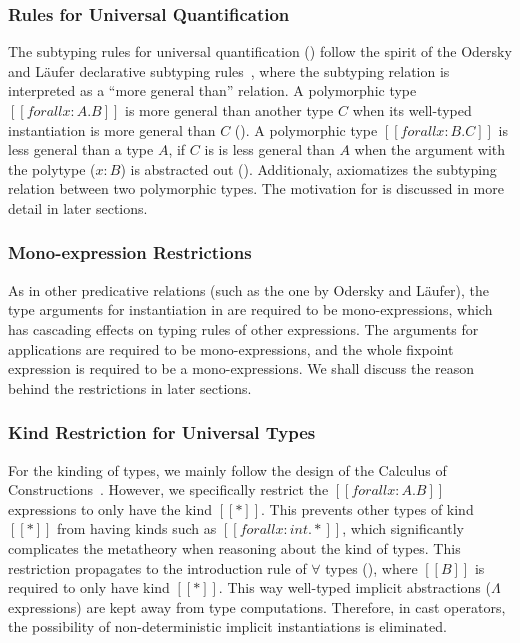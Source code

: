\subsubsection{Rules for Universal Quantification}
The subtyping rules for universal quantification () follow
the spirit of the Odersky and L\"aufer declarative subtyping rules~\cite{oderskylaufer,DunfieldJoshua2013Caeb},
where the subtyping relation is interpreted as a ``more general than'' relation.
A polymorphic type $[[forall x : A. B]]$
is more general than another type $C$ when its well-typed
instantiation is more general than $C$ (). A polymorphic
type $[[forall x : B. C]]$ is less general than a type $A$,
if $C$ is is less general than $A$ when the argument with the polytype ($x:B$)
is abstracted out (). Additionaly, 
axiomatizes the subtyping relation between two polymorphic types.
The motivation for  is discussed in more detail in later sections.

\subsubsection{Mono-expression Restrictions}
As in other predicative relations (such as the one by Odersky and L\"aufer),
the type arguments for instantiation in  are
required to be mono-expressions, which has cascading effects on typing rules of
other expressions. The arguments for applications are required to be
mono-expressions, and the whole fixpoint expression is required to be a
mono-expressions. We shall
discuss the reason behind the restrictions in later sections.

\subsubsection{Kind Restriction for Universal Types}
\label{sec:kind-restriction}

For the kinding of types, we mainly follow the design of the Calculus of
Constructions~\cite{CoquandThierry1988Tcoc}. However, we specifically restrict
the $[[forall x : A. B]]$
expressions to only have the kind $[[*]]$. This prevents other types of kind
$[[*]]$ from having kinds such as $[[forall x : int. *]]$,
which significantly complicates the metatheory when reasoning about the kind of types.
This restriction propagates to the introduction rule of $\forall$ types (),
where $[[B]]$ is required to only have kind $[[*]]$.
This way well-typed implicit abstractions ($\Lambda$ expressions) are kept away
from type computations. Therefore, in cast operators,
the possibility of non-deterministic implicit instantiations is eliminated.

